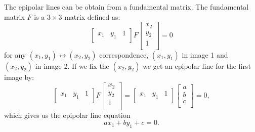 The epipolar lines can be obtain from a fundamental matrix. The fundamental matrix $F$ is a $3 \times 3$ matrix defined as:
\begin{equation}
	\begin{bmatrix}
		x_1 & y_1 & 1 \\
	\end{bmatrix}
	F
	\begin{bmatrix}
		x_2 \\
		y_2 \\
		1 \\
	\end{bmatrix}
	= 0
	\label{eq:fundamental-matrix}
\end{equation}
for any $(x_1, y_1) \leftrightarrow (x_2, y_2)$ correspondence, $(x_1, y_1)$ in image 1 and $(x_2, y_2)$ in image 2. If we fix the $(x_2, y_2)$ we get an epipolar line for the first image by:
\begin{equation}
	\begin{bmatrix}
		x_1 & y_1 & 1 \\
	\end{bmatrix}
	F
	\begin{bmatrix}
		x_2 \\
		y_2 \\
		1 \\
	\end{bmatrix}
	=
	\begin{bmatrix}
		x_1 & y_1 & 1 \\
	\end{bmatrix}
	\begin{bmatrix}
		a \\
		b \\
		c \\
	\end{bmatrix}
	= 0,
\end{equation}
which gives us the epipolar line equation
\begin{equation}
	ax_1 + by_1 + c = 0.
\end{equation}

